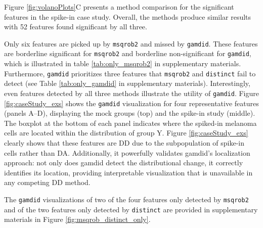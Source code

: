 Figure \ref{fig:volanoPlots}C presents a method comparison for
the significant features in the spike-in case study. Overall, the methods produce
similar results with 52 features found significant by all three.


Only six features are picked up by \texttt{msqrob2} and missed by \texttt{gamdid}.
These features are borderline significant for \texttt{msqrob2} and borderline
non-significant for \texttt{gamdid}, which is illustrated in table
\ref{tab:only_msqrob2} in supplementary materials.\\
Furthermore, \texttt{gamdid} prioritizes three features that \texttt{msqrob2}
and \texttt{distinct} fail to detect (see Table \ref{tab:only_gamdid} in
supplementary materials).
Interestingly, even features detected by all three methods illustrate the utility
of \texttt{gamdid}. Figure \ref{fig:caseStudy_exs} shows the
\texttt{gamdid} visualization for four representative features (panels A--D), displaying the
mock groups (top) and the spike-in study (middle). The boxplot at the bottom of each panel
indicates where the spiked-in melanoma cells are
located within the distribution of group Y. Figure \ref{fig:caseStudy_exs} clearly
shows that these features are DD due to the subpopulation of spike-in cells rather
than DA. Additionally, it powerfully validates gamdid’s localization approach:
not only does gamdid detect the distributional change, it correctly identifies
its location, providing interpretable visualization that is unavailable in any
competing DD method.


The \texttt{gamdid} visualizations of two of the four features
only detected by \texttt{msqrob2} and of the two features only detected by
\texttt{distinct} are provided in supplementary materials in
Figure \ref{fig:msqrob_distinct_only}.

